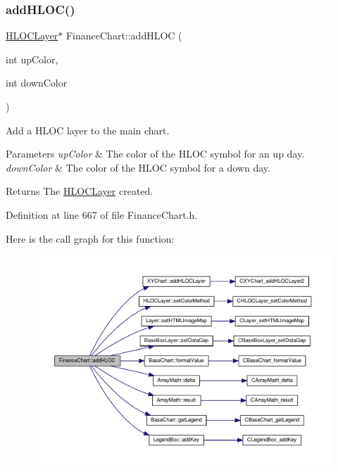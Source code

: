 \subsubsection{\texorpdfstring{add\+H\+L\+O\+C()}{addHLOC()}}
{\footnotesize\ttfamily \hyperlink{class_h_l_o_c_layer}{H\+L\+O\+C\+Layer}$\ast$ Finance\+Chart\+::add\+H\+L\+OC (\begin{DoxyParamCaption}\item[{int}]{up\+Color,  }\item[{int}]{down\+Color }\end{DoxyParamCaption})\hspace{0.3cm}{\ttfamily [inline]}}



Add a H\+L\+OC layer to the main chart. 


\begin{DoxyParams}{Parameters}
{\em up\+Color} & The color of the H\+L\+OC symbol for an up day.\\
\hline
{\em down\+Color} & The color of the H\+L\+OC symbol for a down day.\\
\hline
\end{DoxyParams}
\begin{DoxyReturn}{Returns}
The \hyperlink{class_h_l_o_c_layer}{H\+L\+O\+C\+Layer} created.
\end{DoxyReturn}


Definition at line 667 of file Finance\+Chart.\+h.

Here is the call graph for this function\+:
\nopagebreak
\begin{figure}[H]
\begin{center}
\leavevmode
\includegraphics[width=350pt]{class_finance_chart_ab54186072d9b48c643dfeeb824968d31_cgraph}
\end{center}
\end{figure}
\mbox{\label{class_finance_chart_a2e27a54f9787005383604fe1ebac4c58}} 
